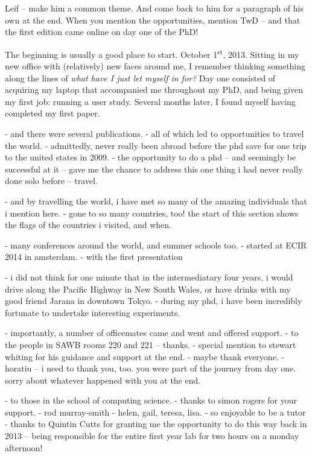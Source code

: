 \begin{preamble}
\todo{======}

Leif -- make him a common theme. And come back to him for a paragraph of his own at the end. When you mention the opportunities, mention TwD -- and that the first edition came online on day one of the PhD!

The beginning is usually a good place to start. October 1\textsuperscript{st}, 2013. Sitting in my new office with (relatively) new faces around me, I remember thinking something along the lines of \emph{what have I just let myself in for?} Day one consisted of acquiring my laptop that accompanied me throughout my PhD, and being given my first job: running a user study. Several months later, I found myself having completed my first paper.

- and there were several publications.
- all of which led to opportunities to travel the world.
- admittedly, never really been abroad before the phd save for one trip to the united states in 2009.
- the opportunity to do a phd -- and seemingly be successful at it -- gave me the chance to address this one thing i had never really done solo before -- travel.

- and by travelling the world, i have met so many of the amazing individuals that i mention here.
- gone to so many countries, too! the start of this section shows the flags of the countries i visited, and when.

- many conferences around the world, and summer schools too.
    - started at ECIR 2014 in amsterdam.
    - with the first presentation 

- i did not think for one minute that in the intermediatary four years, i would drive along the Pacific Highway in New South Wales, or have drinks with my good friend Jarana in downtown Tokyo.
- during my phd, i have been incredibly fortunate to undertake interesting experiments.

- importantly, a number of officemates came and went and offered support.
- to the people in SAWB rooms 220 and 221 -- thanks.
    - special mention to stewart whiting for his guidance and support at the end.
    - maybe thank everyone.
    - horatiu -- i need to thank you, too. you were part of the journey from day one. sorry about whatever happened with you at the end.

- to those in the school of computing science.
    - thanks to simon rogers for your support.
    - rod murray-smith
    - helen, gail, teresa, lisa.
        - so enjoyable to be a tutor
        - thanks to Quintin Cutts for granting me the opportunity to do this way back in 2013 -- being responsible for the entire first year lab for two hours on a monday afternoon!
        

\end{preamble}
